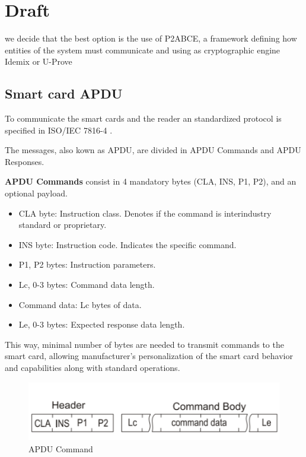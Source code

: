 \chapter{Draft}\label{ch:draft}


we decide that the best option is the use of P2ABCE, a framework defining how entities of the system must communicate and using as cryptographic engine Idemix or U-Prove


\section{Smart card APDU}

To communicate the smart cards and the reader an standardized protocol is specified in ISO/IEC 7816-4 \citep{APDUISO}.

The messages, also kown as \ac{APDU}, are divided in APDU Commands and APDU Responses.

\textbf{APDU Commands} consist in 4 mandatory bytes (CLA, INS, P1, P2), and an optional payload.

\begin{itemize}
	\item CLA byte: Instruction class. Denotes if the command is interindustry standard or proprietary.
	\item INS byte: Instruction code. Indicates the specific command.
	\item P1, P2 bytes: Instruction parameters.
	\item Lc, 0-3 bytes: Command data length.
	\item Command data: Lc bytes of data.
	\item Le, 0-3 bytes: Expected response data length.
\end{itemize}

This way, minimal number of bytes are needed to transmit commands to the smart card, allowing manufacturer's personalization of the smart card behavior and capabilities along with standard operations.

\begin{figure}[bth]
	\begin{center}
		\includegraphics[width=0.55\linewidth]{gfx/APDUCommand}
	\end{center}
	\caption{APDU Command}
	\label{fig:APDUCommand}
\end{figure}



